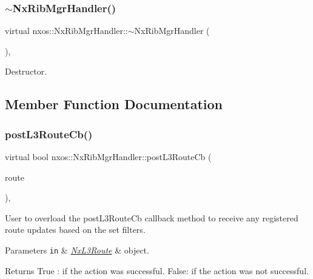 \subsubsection{\texorpdfstring{$\sim$\+Nx\+Rib\+Mgr\+Handler()}{~NxRibMgrHandler()}}
{\footnotesize\ttfamily virtual nxos\+::\+Nx\+Rib\+Mgr\+Handler\+::$\sim$\+Nx\+Rib\+Mgr\+Handler (\begin{DoxyParamCaption}{ }\end{DoxyParamCaption})\hspace{0.3cm}{\ttfamily [inline]}, {\ttfamily [virtual]}}

Destructor. 

\subsection{Member Function Documentation}
\mbox{\label{classnxos_1_1_nx_rib_mgr_handler_a1b742d50365fdece0ea47eb38300f7de}} 
\subsubsection{\texorpdfstring{post\+L3\+Route\+Cb()}{postL3RouteCb()}}
{\footnotesize\ttfamily virtual bool nxos\+::\+Nx\+Rib\+Mgr\+Handler\+::post\+L3\+Route\+Cb (\begin{DoxyParamCaption}\item[{\mbox{\hyperlink{classnxos_1_1_nx_l3_route}{Nx\+L3\+Route}} $\ast$}]{route }\end{DoxyParamCaption})\hspace{0.3cm}{\ttfamily [inline]}, {\ttfamily [virtual]}}

User to overload the post\+L3\+Route\+Cb callback method to receive any registered route updates based on the set filters. 
\begin{DoxyParams}[1]{Parameters}
\mbox{\tt in}  & {\em \mbox{\hyperlink{classnxos_1_1_nx_l3_route}{Nx\+L3\+Route}}} & object.\\
\hline
\end{DoxyParams}
\begin{DoxyReturn}{Returns}
True \+: if the action was successful. False\+: if the action was not successful.
\end{DoxyReturn}

